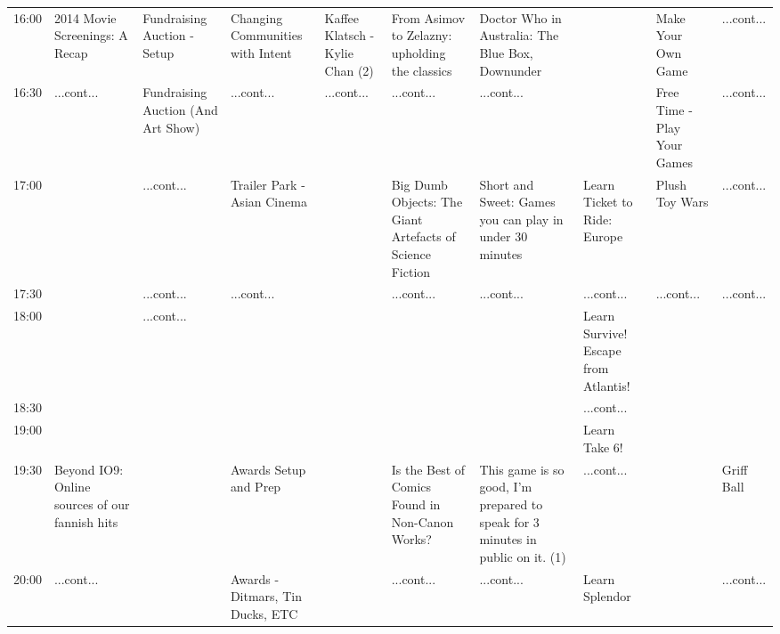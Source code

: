 \documentclass{scrreprt}
\begin{document}
\begin{landscape}
\begin{tabular}{c||p{25mm}|p{25mm}|p{25mm}|p{25mm}|p{25mm}|p{25mm}|p{25mm}|p{25mm}|p{25mm}|}
16:00&\cellcolor[gray]{0.512770} 2014 Movie Screenings: A Recap&\cellcolor[gray]{0.598998} Fundraising Auction - Setup&\cellcolor[gray]{0.626248} Changing Communities with Intent&\cellcolor[gray]{0.599794} Kaffee Klatsch - Kylie Chan (2)&\cellcolor[gray]{0.741172} From Asimov to Zelazny: upholding the classics&\cellcolor[gray]{0.572795} Doctor Who in Australia: The Blue Box, Downunder&&\cellcolor[gray]{0.586169} Make Your Own Game&\cellcolor[gray]{0.883664} ...cont...\\
16:30&\cellcolor[gray]{0.512770} ...cont...&\cellcolor[gray]{0.865831} Fundraising Auction (And Art Show)&\cellcolor[gray]{0.626248} ...cont...&\cellcolor[gray]{0.599794} ...cont...&\cellcolor[gray]{0.741172} ...cont...&\cellcolor[gray]{0.572795} ...cont...&&\cellcolor[gray]{0.990305} Free Time - Play Your Games&\cellcolor[gray]{0.883664} ...cont...\\
17:00&&\cellcolor[gray]{0.865831} ...cont...&\cellcolor[gray]{0.668834} Trailer Park - Asian Cinema&&\cellcolor[gray]{0.529655} Big Dumb Objects: The Giant Artefacts of Science Fiction&\cellcolor[gray]{0.608737} Short and Sweet: Games you can play in under 30 minutes&\cellcolor[gray]{0.713768} Learn Ticket to Ride: Europe&\cellcolor[gray]{0.941862} Plush Toy Wars&\cellcolor[gray]{0.883664} ...cont...\\
17:30&&\cellcolor[gray]{0.865831} ...cont...&\cellcolor[gray]{0.668834} ...cont...&&\cellcolor[gray]{0.529655} ...cont...&\cellcolor[gray]{0.608737} ...cont...&\cellcolor[gray]{0.713768} ...cont...&\cellcolor[gray]{0.941862} ...cont...&\cellcolor[gray]{0.883664} ...cont...\\
18:00&&\cellcolor[gray]{0.865831} ...cont...&&&&&\cellcolor[gray]{0.508803} Learn Survive! Escape from Atlantis!&&\\
18:30&&&&&&&\cellcolor[gray]{0.508803} ...cont...&&\\
19:00&&&&&&&\cellcolor[gray]{0.644988} Learn Take 6!&&\\
19:30&\cellcolor[gray]{0.707885} Beyond IO9: Online sources of our fannish hits&&\cellcolor[gray]{0.808268} Awards Setup and Prep&&\cellcolor[gray]{0.638154} Is the Best of Comics Found in Non-Canon Works?&\cellcolor[gray]{0.565179} This game is so good, I'm prepared to speak for 3 minutes in public on it. (1)&\cellcolor[gray]{0.644988} ...cont...&&\cellcolor[gray]{0.603771} Griff Ball\\
20:00&\cellcolor[gray]{0.707885} ...cont...&&\cellcolor[gray]{0.877898} Awards - Ditmars, Tin Ducks, ETC&&\cellcolor[gray]{0.638154} ...cont...&\cellcolor[gray]{0.565179} ...cont...&\cellcolor[gray]{0.941412} Learn Splendor&&\cellcolor[gray]{0.603771} ...cont...\\

\end{tabular}
\end{landscape}
\end{document}
